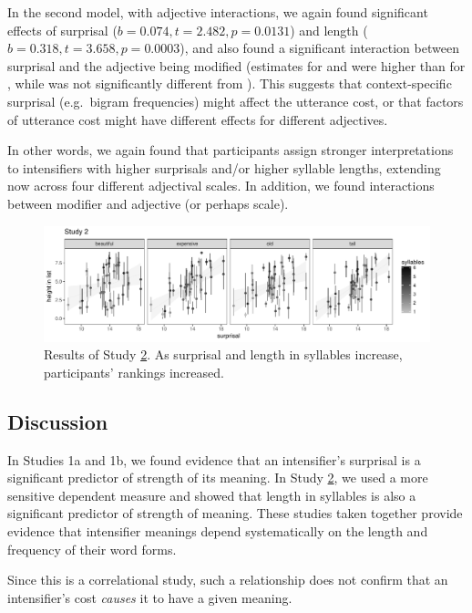 In the second model, with adjective interactions, we again found significant effects of surprisal ($b=0.074, t=2.482, p=0.0131$) and length ($b=0.318, t=3.658, p=0.0003$), and also found a significant interaction between surprisal and the adjective being modified (estimates for  and  were higher than for , while  was not significantly different from ).
This suggests that context-specific surprisal (e.g.~bigram frequencies) might affect the utterance cost, or that factors of utterance cost might have different effects for different adjectives.

In other words, we again found that participants assign stronger interpretations to intensifiers with higher surprisals and/or higher syllable lengths, extending now across four different adjectival scales.
In addition, we found interactions between modifier and adjective (or perhaps scale).

\begin{figure}[hbt]
\begin{center}
\includegraphics[width=\textwidth]{images/plot_study2.pdf}
\end{center}
\caption{Results of Study \hyperref[sec:study2]{2}. As surprisal and length in syllables increase, participants' rankings increased.} 
\label{fig:plot_study2}
\end{figure}

\subsection{Discussion}

In Studies 1a and 1b, we found evidence that an intensifier's surprisal is a significant predictor of strength of its meaning. In Study \hyperref[sec:study2]{2}, we used a more sensitive dependent measure and showed that length in syllables is also a significant predictor of strength of meaning.
These studies taken together provide evidence that intensifier meanings depend systematically on the length and frequency of their word forms.

Since this is a correlational study, such a relationship does not confirm that an intensifier's cost \emph{causes} it to have a given meaning.

